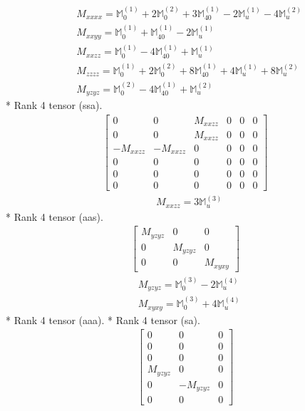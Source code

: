 \documentclass[fleqn,8pt,landscape]{jsarticle}
\begin{document}
\begin{align*}
& M_{xxxx} = \mathbb{M}_{0}^{(1)} + 2 \mathbb{M}_{0}^{(2)} + 3 \mathbb{M}_{40}^{(1)} - 2 \mathbb{M}_{u}^{(1)} - 4 \mathbb{M}_{u}^{(2)} \\
& M_{xxyy} = \mathbb{M}_{0}^{(1)} + \mathbb{M}_{40}^{(1)} - 2 \mathbb{M}_{u}^{(1)} \\
& M_{xxzz} = \mathbb{M}_{0}^{(1)} - 4 \mathbb{M}_{40}^{(1)} + \mathbb{M}_{u}^{(1)} \\
& M_{zzzz} = \mathbb{M}_{0}^{(1)} + 2 \mathbb{M}_{0}^{(2)} + 8 \mathbb{M}_{40}^{(1)} + 4 \mathbb{M}_{u}^{(1)} + 8 \mathbb{M}_{u}^{(2)} \\
& M_{yzyz} = \mathbb{M}_{0}^{(2)} - 4 \mathbb{M}_{40}^{(1)} + \mathbb{M}_{u}^{(2)}
\end{align*}
* Rank 4 tensor (ssa).
\begin{align*}
\begin{bmatrix} 0 & 0 & M_{xxzz} & 0 & 0 & 0 \\ 0 & 0 & M_{xxzz} & 0 & 0 & 0 \\ - M_{xxzz} & - M_{xxzz} & 0 & 0 & 0 & 0 \\ 0 & 0 & 0 & 0 & 0 & 0 \\ 0 & 0 & 0 & 0 & 0 & 0 \\ 0 & 0 & 0 & 0 & 0 & 0 \end{bmatrix}
\end{align*}
\begin{align*}
& M_{xxzz} = 3 \mathbb{M}_{u}^{(3)}
\end{align*}
* Rank 4 tensor (aas).
\begin{align*}
\begin{bmatrix} M_{yzyz} & 0 & 0 \\ 0 & M_{yzyz} & 0 \\ 0 & 0 & M_{xyxy} \end{bmatrix}
\end{align*}
\begin{align*}
& M_{yzyz} = \mathbb{M}_{0}^{(3)} - 2 \mathbb{M}_{u}^{(4)} \\
& M_{xyxy} = \mathbb{M}_{0}^{(3)} + 4 \mathbb{M}_{u}^{(4)}
\end{align*}
* Rank 4 tensor (aaa).
* Rank 4 tensor (sa).
\begin{align*}
\begin{bmatrix} 0 & 0 & 0 \\ 0 & 0 & 0 \\ 0 & 0 & 0 \\ M_{yzyz} & 0 & 0 \\ 0 & - M_{yzyz} & 0 \\ 0 & 0 & 0 \end{bmatrix}
\end{align*}
\end{document}
